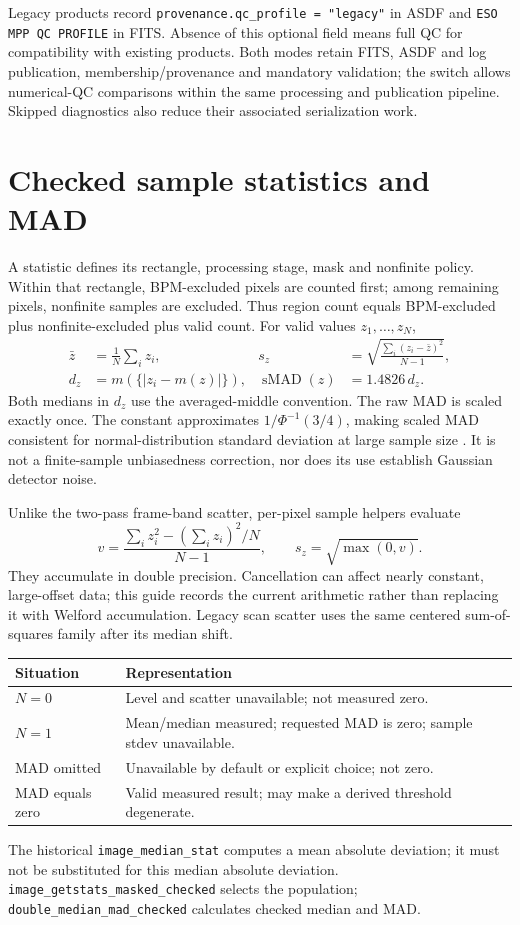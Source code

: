 \documentclass[11pt,a4paper]{article}
\newcommand{\code}[1]{\nolinkurl{#1}}
\begin{document}
Legacy products record \texttt{provenance.qc\_profile = "legacy"} in ASDF
and \texttt{ESO MPP QC PROFILE} in FITS. Absence of this optional field means
full QC for compatibility with existing products. Both modes retain FITS,
ASDF and log publication, membership/provenance and mandatory validation;
the switch allows numerical-QC comparisons within the same processing and
publication pipeline. Skipped diagnostics also reduce their associated
serialization work.

\section{Checked sample statistics and MAD}
A statistic defines its rectangle, processing stage, mask and nonfinite policy.
Within that rectangle, BPM-excluded pixels are counted first; among remaining
pixels, nonfinite samples are excluded. Thus region count equals BPM-excluded
plus nonfinite-excluded plus valid count. For valid values $z_1,\ldots,z_N$,
\begin{align}
 \bar z&=\frac1N\sum_i z_i, &
 s_z&=\sqrt{\frac{\sum_i(z_i-\bar z)^2}{N-1}},\\
 d_z&=m(\{|z_i-m(z)|\}),& \operatorname{sMAD}(z)&=1.4826\,d_z.
\end{align}
Both medians in $d_z$ use the averaged-middle convention. The raw MAD is scaled
exactly once. The constant approximates $1/\Phi^{-1}(3/4)$, making scaled MAD
consistent for normal-distribution standard deviation at large sample size
\cite{r-mad,nist-mad}. It is not a finite-sample unbiasedness correction, nor
does its use establish Gaussian detector noise.

Unlike the two-pass frame-band scatter, per-pixel sample helpers evaluate
\[
 v=\frac{\sum_i z_i^2-(\sum_i z_i)^2/N}{N-1},\qquad
 s_z=\sqrt{\max(0,v)}.
\]
They accumulate in double precision. Cancellation can affect nearly constant,
large-offset data; this guide records the current arithmetic rather than
replacing it with Welford accumulation. Legacy scan scatter uses the same
centered sum-of-squares family after its median shift.

\begin{center}
\begin{tabular}{>{\raggedright\arraybackslash}p{25mm}>{\raggedright\arraybackslash}p{115mm}}
\toprule Situation & Representation \\\midrule
$N=0$ & Level and scatter unavailable; not measured zero.\\
$N=1$ & Mean/median measured; requested MAD is zero; sample stdev unavailable.\\
MAD omitted & Unavailable by default or explicit choice; not zero.\\
MAD equals zero & Valid measured result; may make a derived threshold degenerate.\\
\bottomrule
\end{tabular}
\end{center}
The historical \code{image_median_stat} computes a mean absolute deviation;
it must not be substituted for this median absolute deviation.
\code{image_getstats_masked_checked} selects the population;
\code{double_median_mad_checked} calculates checked median and MAD.
\end{document}
